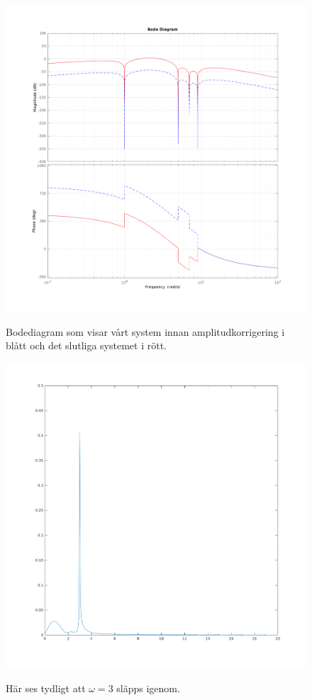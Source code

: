 \begin{figure}
    \caption{Bodediagram som visar vårt system innan amplitudkorrigering i
    blått och det slutliga systemet i rött.}
    \centering
    \includegraphics[scale=0.55]{figures/task4d-bode.png}
    \label{fig:task4d-bode}
\end{figure}

\begin{figure}
    \caption{Här ses tydligt att $\omega = 3$ släpps igenom.}
    \centering
    \includegraphics[scale=0.25]{figures/task4e-fk-x-sys2.png}
    \label{fig:task4e-fk-x-sys2}
\end{figure}


